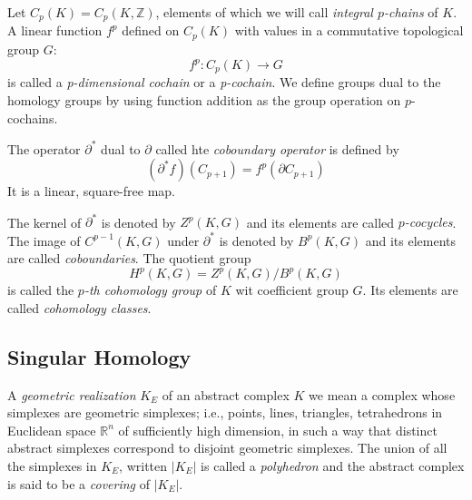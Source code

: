 \begin{defn}

	Let $C_p(K) = C_p(K, \mathbb{Z})$, elements of which we will call \textit{integral $p$-chains} of $K$. A linear function $f^p$ defined on $C_p(K)$ with values in a commutative topological group $G$:
	\[
		f^p: C_p(K) \to G
	\]
	is called a \textit{p-dimensional cochain} or a \textit{p-cochain}. We define groups dual to the homology groups by using function addition as the group operation on $p$-cochains.

\end{defn}


\begin{defn}

The operator $\partial^*$ dual to $ \partial$ called hte \textit{coboundary operator} is defined by 
\[
	\left( \partial^* f \right)(C_{ p+1 }) = f^p \left( \partial C_{ p+1 } \right)
\]
It is a linear, square-free map.
\end{defn}

\begin{defn}

	The kernel of $\partial^*$ is denoted by $Z^p(K,G)$ and its elements are called \textit{$p$-cocycles}. The image of $C^{ p-1 }(K,G)$ under $ \partial^*$ is denoted by $B^p(K,G)$ and its elements are called \textit{coboundaries}. The quotient group 
	\[
		H^p(K,G) = Z^p(K,G) / B^p(K,G)
	\]
	is called the \textit{$p$-th cohomology group} of $K$ wit coefficient group $G$. Its elements are called \textit{cohomology classes}.

\end{defn}

\subsection{Singular Homology}

\begin{defn}

A \textit{geometric realization} $K_E$ of an abstract complex $K$ we mean a complex whose simplexes are geometric simplexes; i.e., points, lines, triangles, tetrahedrons in Euclidean space $ \mathbb{R}^n$ of sufficiently high dimension, in such a way that distinct abstract simplexes correspond to disjoint geometric simplexes. The union of all the simplexes in $K_E$, written $ \vert K_E \vert$ is called a \textit{polyhedron} and the abstract complex is said to be a \textit{covering} of $ \vert K_E \vert$.

\end{defn}

